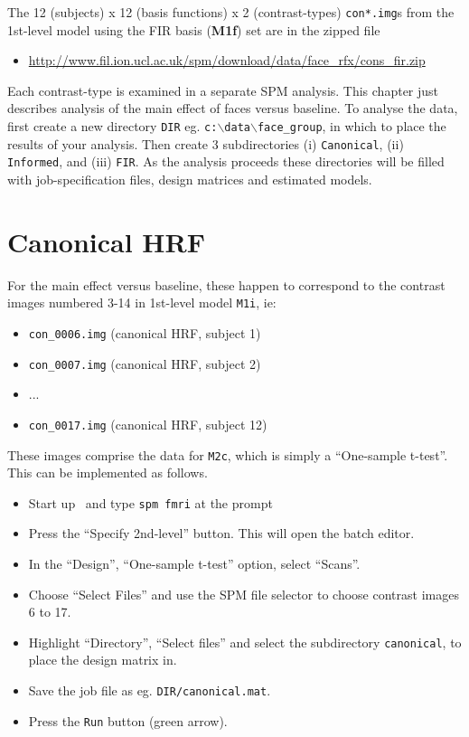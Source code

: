 The 12 (subjects) x 12 (basis functions) x 2 (contrast-types) \texttt{con*.img}s from the 1st-level model using the FIR basis (\textbf{M1f}) set are in the zipped file
\begin{itemize}
\item \url{http://www.fil.ion.ucl.ac.uk/spm/download/data/face_rfx/cons_fir.zip}
\end{itemize}

Each contrast-type is examined in a separate SPM analysis. This chapter just describes analysis of the main effect of faces versus baseline.
To analyse the data, first create a new directory \texttt{DIR} eg. \texttt{c:$\backslash$data$\backslash$face\_group}, in which to place the results of your analysis. Then create 3 subdirectories (i) \texttt{Canonical}, (ii) \texttt{Informed}, and (iii) \texttt{FIR}. 
As the analysis proceeds these directories will be filled with job-specification files, design matrices and estimated models.

\section{Canonical HRF}

For the main effect versus baseline, these happen to correspond to the contrast images numbered 3-14 in 1st-level model \texttt{M1i}, ie:

\begin{itemize}
\item \texttt{con\_0006.img}       (canonical HRF, subject 1)
\item \texttt{con\_0007.img}       (canonical HRF, subject 2)
\item ...
\item \texttt{con\_0017.img}       (canonical HRF, subject 12)
\end{itemize}
These images comprise the data for \texttt{M2c}, which is simply a ``One-sample t-test''. This can be implemented as follows.
\begin{itemize}
\item Start up \matlab\ and type \texttt{spm fmri} at the prompt
\item Press the ``Specify 2nd-level'' button. This will open the batch editor.
\item In the ``Design'', ``One-sample t-test'' option, select ``Scans''.
\item Choose ``Select Files'' and use the SPM file selector to choose contrast images 6 to 17.
\item Highlight ``Directory'', ``Select files'' and select the  subdirectory \texttt{canonical}, to place the design matrix in.
\item Save the job file as eg. \texttt{DIR/canonical.mat}.
\item Press the \texttt{Run} button (green arrow).
\end{itemize}


